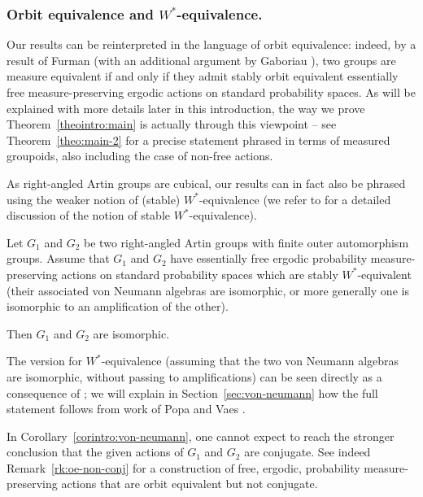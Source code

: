 \subsubsection*{Orbit equivalence and $W^*$-equivalence.} Our results can be reinterpreted in the language of orbit equivalence: indeed, by a result of Furman \cite{Fur2} (with an additional argument by Gaboriau \cite[Th.\,2.3]{Gab2}), two groups are measure equivalent if and only if they admit stably orbit equivalent essentially free measure-preserving ergodic actions on standard probability spaces. As will be explained with more details later in this introduction, the way we prove Theorem~\ref{theointro:main} is actually through this viewpoint -- see Theorem~\ref{theo:main-2} for a precise statement phrased in terms of measured groupoids, also including the case of non-free actions.

As right-angled Artin groups are cubical, our results can in fact also be phrased using the weaker notion of (stable) $W^*$-equivalence (we refer to \cite[\S 6.2]{PV} for a detailed discussion of the notion of stable $W^*$-equivalence).

\begin{corintro}\label{corintro:von-neumann}
Let $G_1$ and $G_2$ be two right-angled Artin groups with finite outer automorphism groups. Assume that $G_1$ and $G_2$ have essentially free ergodic probability measure-preserving actions on standard probability spaces which are stably $W^*$\nobreakdash-equi\-valent (\ie their associated von Neumann algebras are isomorphic, or more generally one is isomorphic to an amplification of the other).

Then $G_1$ and $G_2$ are isomorphic.
\end{corintro}

The version for $W^*$-equivalence (\ie assuming that the two von Neumann algebras are isomorphic, without passing to amplifications) can be seen directly as a consequence of \cite[Cor.\,4.2]{HHL}; we will explain in Section~\ref{sec:von-neumann} how the full statement follows from work of Popa and Vaes \cite{PV1}.

\begin{rk*}
In Corollary~\ref{corintro:von-neumann}, one cannot expect to reach the stronger conclusion that the given actions of $G_1$ and $G_2$ are conjugate. See indeed Remark~\ref{rk:oe-non-conj} for a construction of free, ergodic, probability measure-preserving actions that are orbit equivalent but not conjugate.
\end{rk*}

